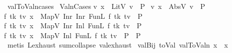 \begin{isabellebody}
\ val{}ToValn{\isachardot}{\kern0pt}cases\isanewline
{}\isamarkupfalse%
\ ValnCases{\isacharcolon}{\kern0pt}\isanewline
{\isachardoublequoteopen}{\isacharparenleft}{\kern0pt}{\isasymAnd}v{\isachardot}{\kern0pt}\ x\ {\isacharequal}{\kern0pt}\ LitV\ v\ {\isasymLongrightarrow}\ P{\isacharparenright}{\kern0pt}\ {\isasymLongrightarrow}\isanewline
{\isacharparenleft}{\kern0pt}{\isasymAnd}v{\isachardot}{\kern0pt}\ x\ {\isacharequal}{\kern0pt}\ AbsV\ v\ {\isasymLongrightarrow}\ P{\isacharparenright}{\kern0pt}\ {\isasymLongrightarrow}\isanewline
{\isacharparenleft}{\kern0pt}{\isasymAnd}f\ tk\ tv{\isachardot}{\kern0pt}\ x\ {\isacharequal}{\kern0pt}\ MapV\ {\isacharparenleft}{\kern0pt}Inr\ {\isacharparenleft}{\kern0pt}Inr\ {\isacharparenleft}{\kern0pt}FunL\ f\ tk\ tv{\isacharparenright}{\kern0pt}{\isacharparenright}{\kern0pt}{\isacharparenright}{\kern0pt}\ {\isasymLongrightarrow}\ P{\isacharparenright}{\kern0pt}\ {\isasymLongrightarrow}\isanewline
{\isacharparenleft}{\kern0pt}{\isasymAnd}f\ tk\ tv{\isachardot}{\kern0pt}\ x\ {\isacharequal}{\kern0pt}\ MapV\ {\isacharparenleft}{\kern0pt}Inr\ {\isacharparenleft}{\kern0pt}Inl\ {\isacharparenleft}{\kern0pt}FunL\ f\ tk\ tv{\isacharparenright}{\kern0pt}{\isacharparenright}{\kern0pt}{\isacharparenright}{\kern0pt}\ {\isasymLongrightarrow}\ P{\isacharparenright}{\kern0pt}\ {\isasymLongrightarrow}\isanewline
{\isacharparenleft}{\kern0pt}{\isasymAnd}f\ tk\ tv{\isachardot}{\kern0pt}\ x\ {\isacharequal}{\kern0pt}\ MapV\ {\isacharparenleft}{\kern0pt}Inl\ {\isacharparenleft}{\kern0pt}FunL\ f\ tk\ tv{\isacharparenright}{\kern0pt}{\isacharparenright}{\kern0pt}\ {\isasymLongrightarrow}\ P{\isacharparenright}{\kern0pt}\ {\isasymLongrightarrow}\ P{\isachardoublequoteclose}\isanewline
%
\isadelimproof
\ \ %
\endisadelimproof
%
\isatagproof
{}\isamarkupfalse%
\ {\isacharparenleft}{\kern0pt}metis\ L{\isachardot}{\kern0pt}exhaust\ sum{\isachardot}{\kern0pt}collapse\ val{\isachardot}{\kern0pt}exhaust{\isacharparenright}{\kern0pt}%
\endisatagproof
{\isafoldproof}%
%
\isadelimproof
%
\endisadelimproof
%
\isadelimdocument
%
\endisadelimdocument
%
\isatagdocument
%
\isamarkuptrue%
%
\endisatagdocument
{\isafolddocument}%
%
\isadelimdocument
%
\endisadelimdocument
{}\isamarkupfalse%
\ valBij{\isacharcolon}{\kern0pt}\ {\isachardoublequoteopen}toVal{}{}{}{}\ {\isacharparenleft}{\kern0pt}val{}ToValn\ x{\isacharparenright}{\kern0pt}\ {\isacharequal}{\kern0pt}\ x{\isachardoublequoteclose}\isanewline

\end{isabellebody}

